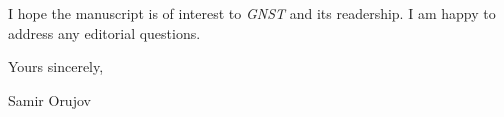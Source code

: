 \documentclass[12pt,a4paper]{article}
\begin{document}
\medskip

I hope the manuscript is of interest to \textit{GNST} and its readership.
I am happy to address any editorial questions.

\bigskip

\noindent Yours sincerely,

\bigskip
\bigskip

\noindent Samir Orujov
\end{document}
